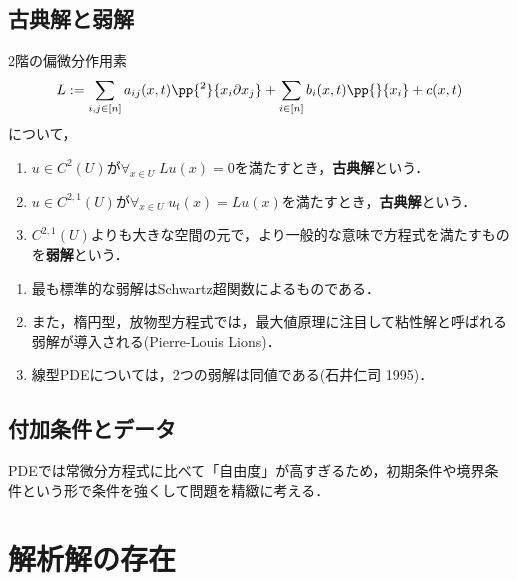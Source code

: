 \documentclass[uplatex,dvipdfmx]{jsreport}
\begin{document}
\subsection{古典解と弱解}

\begin{definition}
    2階の偏微分作用素
    \[L:=\sum_{i,j\in[n]}a_{ij}(x,t)\pp{^2}{x_i\partial x_j}+\sum_{i\in[n]}b_i(x,t)\pp{}{x_i}+c(x,t)\]
    について，
    \begin{enumerate}
        \item $u\in C^2(U)$が$\forall_{x\in U}\;Lu(x)=0$を満たすとき，\textbf{古典解}という．
        \item $u\in C^{2,1}(U)$が$\forall_{x\in U}\;u_t(x)=Lu(x)$を満たすとき，\textbf{古典解}という．
        \item $C^{2,1}(U)$よりも大きな空間の元で，より一般的な意味で方程式を満たすものを\textbf{弱解}という．
    \end{enumerate}
\end{definition}

\begin{example}\mbox{}
    \begin{enumerate}
        \item 最も標準的な弱解はSchwartz超関数によるものである．
        \item また，楕円型，放物型方程式では，最大値原理に注目して粘性解と呼ばれる弱解が導入される(Pierre-Louis Lions)．
        \item 線型PDEについては，2つの弱解は同値である(石井仁司 1995)．
    \end{enumerate}
\end{example}

\subsection{付加条件とデータ}

\begin{tcolorbox}[colframe=ForestGreen, colback=ForestGreen!10!white,breakable,colbacktitle=ForestGreen!40!white,coltitle=black,fonttitle=\bfseries\sffamily,
title=]
    PDEでは常微分方程式に比べて「自由度」が高すぎるため，初期条件や境界条件という形で条件を強くして問題を精緻に考える．
\end{tcolorbox}

\section{解析解の存在}
\end{document}
